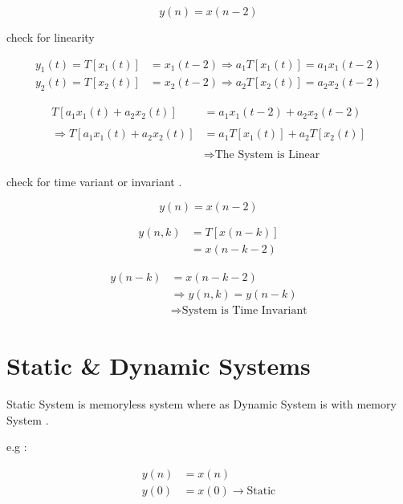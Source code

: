 \documentclass[12pt]{article}
\begin{document}
$$
y(n) = x(n-2)
$$


check for linearity

\begin{align*}
y_{1}(t) = T[x_{1}(t)] &=  x_{1}(t-2) \Rightarrow a_{1} T[x_{1}(t)] = a_{1} x_{1}(t-2)  \\ 
y_{2}(t) = T[x_{2}(t)] &=  x_{2}(t-2) \Rightarrow a_{2} T[x_{2}(t)] = a_{2} x_{2}(t-2)
\end{align*}




\begin{align*}
T[ a_{1}x_{1}(t) + a_{2}x_{2}(t) ] &= a_{1}x_{1}(t-2) + a_{2}x_{2}(t-2) \\ \\ 
\Rightarrow T[ a_{1}x_{1}(t) + a_{2}x_{2}(t) ] &= a_{1}T[x_{1}(t)] + a_{2}T[x_{2}(t)] \\ \\
&\Rightarrow \text{The System is Linear}
\end{align*}






check for time variant or invariant .




$$
y(n) = x(n-2)
$$



\begin{align*}
y(n,k) &= T[x(n-k)] \\ 
&=  x(n-k-2)
\end{align*}




\begin{align*}
y(n-k) &= x(n-k-2) \\ 
&\Rightarrow y(n,k) = y(n-k) \\
&\Rightarrow \text{System is Time Invariant}
\end{align*}








\section{Static \& Dynamic Systems}



Static System is memoryless system where as Dynamic System is with memory System .



e.g : 


\begin{align*}
y(n) &= x(n) \\ 
y(0) &= x(0) \to \text{Static}
\end{align*}
\end{document}
